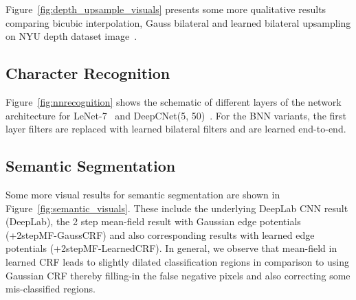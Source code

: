 Figure~\ref{fig:depth_upsample_visuals} presents some more qualitative results comparing bicubic interpolation, Gauss
bilateral and learned bilateral upsampling on NYU depth dataset image~\cite{silberman2012indoor}.

\subsection{Character Recognition}\label{sec:app_character}

 Figure~\ref{fig:nnrecognition} shows the schematic of different layers
 of the network architecture for LeNet-7~\cite{lecun1998mnist}
 and DeepCNet(5, 50)~\cite{ciresan2012multi,graham2014spatially}. For the BNN variants, the first layer filters are replaced
 with learned bilateral filters and are learned end-to-end.

\subsection{Semantic Segmentation}\label{sec:app_semantic_segmentation}

Some more visual results for semantic segmentation are shown in Figure~\ref{fig:semantic_visuals}.
These include the underlying DeepLab CNN\cite{chen2014semantic} result (DeepLab),
the 2 step mean-field result with Gaussian edge potentials (+2stepMF-GaussCRF)
and also corresponding results with learned edge potentials (+2stepMF-LearnedCRF).
In general, we observe that mean-field in learned CRF leads to slightly dilated
classification regions in comparison to using Gaussian CRF thereby filling-in the
false negative pixels and also correcting some mis-classified regions.

